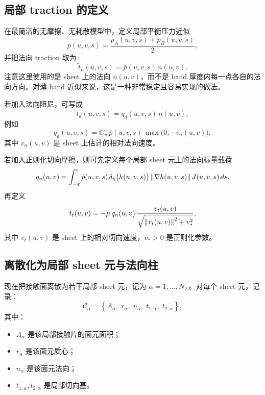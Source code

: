 \documentclass[12pt,a4paper]{ctexart}
\begin{document}
\subsection{局部 traction 的定义}

在最简洁的无摩擦、无耗散模型中，定义局部平衡压力近似
\begin{equation}
    \bar p(u,v,s)=\frac{p_A(u,v,s)+p_B(u,v,s)}{2},
\end{equation}
并把法向 traction 取为
\begin{equation}
    \tilde t_n(u,v,s)=\bar p(u,v,s)\,n(u,v).
\end{equation}
注意这里使用的是 sheet 上的法向 $n(u,v)$，而不是 band 厚度内每一点各自的法向方向。对薄 band 近似来说，这是一种非常稳定且容易实现的做法。

若加入法向阻尼，可写成
\begin{equation}
    \tilde t_d(u,v,s)=q_d(u,v,s)\,n(u,v),
\end{equation}
例如
\begin{equation}
    q_d(u,v,s)=C_n\,\bar p(u,v,s)\,\max\bigl(0,-v_n(u,v)\bigr),
\end{equation}
其中 $v_n(u,v)$ 是 sheet 上估计的相对法向速度。

若加入正则化切向摩擦，则可先定义每个局部 sheet 元上的法向标量载荷
\begin{equation}
    q_n(u,v)=
    \int_{-\varepsilon}^{\varepsilon}
    \bar p(u,v,s)\,
    \delta_\eta\bigl(h(u,v,s)\bigr)\,
    \norm{\nabla h(u,v,s)}\,
    J(u,v,s)\,ds,
\end{equation}
再定义
\begin{equation}
    \tilde t_t(u,v)=
    -\mu\,q_n(u,v)\,
    \frac{v_t(u,v)}{\sqrt{\norm{v_t(u,v)}^2+v_*^2}},
\end{equation}
其中 $v_t(u,v)$ 是 sheet 上的相对切向速度，$v_*>0$ 是正则化参数。

\subsection{离散化为局部 sheet 元与法向柱}

现在把接触面离散为若干局部 sheet 元，记为 $\alpha=1,\dots,N_\Sigma$。对每个 sheet 元，记录：
\begin{equation}
    \mathcal C_\alpha=
    \left\{
    A_\alpha,\;
    r_\alpha,\;
    n_\alpha,\;
    t_{1,\alpha},\;
    t_{2,\alpha}
    \right\},
\end{equation}
其中：
\begin{itemize}
    \item $A_\alpha$ 是该局部接触片的面元面积；
    \item $r_\alpha$ 是该面元质心；
    \item $n_\alpha$ 是该面元法向；
    \item $t_{1,\alpha},t_{2,\alpha}$ 是局部切向基。
\end{itemize}
\end{document}
